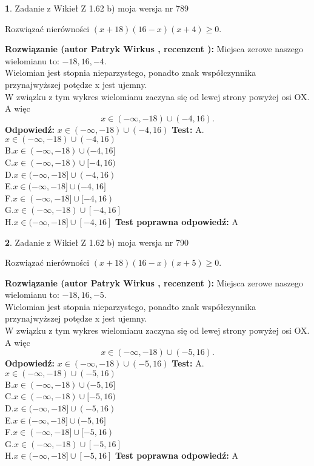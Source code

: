 \documentclass[12pt, a4paper]{article}
\theoremstyle{definition} %
\newtheorem{zad}{}
\newcommand{\zadStart}[1]{\begin{zad}#1\newline}
\newcommand{\zadStop}{\end{zad}}
\newcommand{\rozwStart}[2]{\noindent \textbf{Rozwiązanie (autor #1 , recenzent #2): }\newline}
\newcommand{\rozwStop}{\newline}
\newcommand{\odpStart}{\noindent \textbf{Odpowiedź:}\newline}
\newcommand{\odpStop}{\newline}
\newcommand{\testStart}{\noindent \textbf{Test:}\newline}
\newcommand{\testStop}{\newline}
\newcommand{\kluczStart}{\noindent \textbf{Test poprawna odpowiedź:}\newline}
\newcommand{\kluczStop}{\newline}
\begin{document}
\zadStart{Zadanie z Wikieł Z 1.62 b) moja wersja nr 789}

Rozwiązać nierówności $(x+18)(16-x)(x+4)\ge0$.
\zadStop
\rozwStart{Patryk Wirkus}{}
Miejsca zerowe naszego wielomianu to: $-18, 16, -4$.\\
Wielomian jest stopnia nieparzystego, ponadto znak współczynnika przy\linebreak najwyższej potędze x jest ujemny.\\ W związku z tym wykres wielomianu zaczyna się od lewej strony powyżej osi OX. A więc $$x \in (-\infty,-18) \cup (-4,16).$$
\rozwStop
\odpStart
$x \in (-\infty,-18) \cup (-4,16)$
\odpStop
\testStart
A.$x \in (-\infty,-18) \cup (-4,16)$\\
B.$x \in (-\infty,-18) \cup (-4,16]$\\
C.$x \in (-\infty,-18) \cup [-4,16)$\\
D.$x \in (-\infty,-18] \cup (-4,16)$\\
E.$x \in (-\infty,-18] \cup (-4,16]$\\
F.$x \in (-\infty,-18] \cup [-4,16)$\\
G.$x \in (-\infty,-18) \cup [-4,16]$\\
H.$x \in (-\infty,-18] \cup [-4,16]$
\testStop
\kluczStart
A
\kluczStop



\zadStart{Zadanie z Wikieł Z 1.62 b) moja wersja nr 790}

Rozwiązać nierówności $(x+18)(16-x)(x+5)\ge0$.
\zadStop
\rozwStart{Patryk Wirkus}{}
Miejsca zerowe naszego wielomianu to: $-18, 16, -5$.\\
Wielomian jest stopnia nieparzystego, ponadto znak współczynnika przy\linebreak najwyższej potędze x jest ujemny.\\ W związku z tym wykres wielomianu zaczyna się od lewej strony powyżej osi OX. A więc $$x \in (-\infty,-18) \cup (-5,16).$$
\rozwStop
\odpStart
$x \in (-\infty,-18) \cup (-5,16)$
\odpStop
\testStart
A.$x \in (-\infty,-18) \cup (-5,16)$\\
B.$x \in (-\infty,-18) \cup (-5,16]$\\
C.$x \in (-\infty,-18) \cup [-5,16)$\\
D.$x \in (-\infty,-18] \cup (-5,16)$\\
E.$x \in (-\infty,-18] \cup (-5,16]$\\
F.$x \in (-\infty,-18] \cup [-5,16)$\\
G.$x \in (-\infty,-18) \cup [-5,16]$\\
H.$x \in (-\infty,-18] \cup [-5,16]$
\testStop
\kluczStart
A
\kluczStop
\end{document}
